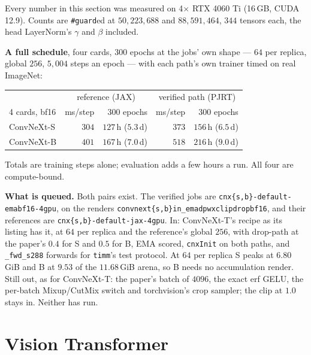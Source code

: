 \noindent Every number in this section was measured on
4$\times$ RTX 4060 Ti (16\,GB, CUDA 12.9). Counts are \texttt{\#guard}ed at
$50{,}223{,}688$ and $88{,}591{,}464$, $344$ tensors each, the head
LayerNorm's $\gamma$ and $\beta$ included.

\medskip\noindent \textbf{A full schedule}, four cards, $300$ epochs at the
jobs' own shape --- $64$ per replica, global $256$, $5{,}004$ steps an
epoch --- with each path's own trainer timed on real ImageNet:

\begin{center}
\begin{tabular}{@{}l r r r r@{}}
\hline
 & \multicolumn{2}{c}{reference (JAX)} & \multicolumn{2}{c}{verified path (PJRT)} \\
4 cards, bf16 & ms/step & 300 epochs & ms/step & 300 epochs \\
\hline
ConvNeXt-S & $304$ & $127$\,h \;($5.3$\,d) & $373$ & $156$\,h \;($6.5$\,d) \\
ConvNeXt-B & $401$ & $167$\,h \;($7.0$\,d) & $518$ & $216$\,h \;($9.0$\,d) \\
\hline
\end{tabular}
\end{center}

\noindent Totals are training steps alone; evaluation adds a few hours a
run. All four are compute-bound.

\medskip\noindent\textbf{What is queued.} Both pairs exist. The verified
jobs are \texttt{cnx\{s,b\}-default-emabf16-4gpu}, on the renders
\texttt{convnext\{s,b\}in\_\allowbreak emadpwxclipdropbf16}, and their
references are \texttt{cnx\{s,b\}-default-jax-4gpu}. In:
ConvNeXt-T's recipe as its listing has it, at $64$ per replica and the
reference's global $256$, with drop-path at the paper's $0.4$ for S and
$0.5$ for B, EMA scored, \texttt{cnxInit} on both paths, and
\texttt{\_fwd\_s288} forwards for \texttt{timm}'s test protocol. At $64$ per
replica S peaks at $6.80$\,GiB and B at $9.53$ of the $11.68$\,GiB arena, so
B needs no accumulation render. Still out, as for ConvNeXt-T: the paper's
batch of $4096$, the exact erf GELU, the per-batch Mixup/CutMix switch and
torchvision's crop sampler; the clip at $1.0$ stays in. Neither has run.

\chapter{Vision Transformer}
\label{chap:attention}


